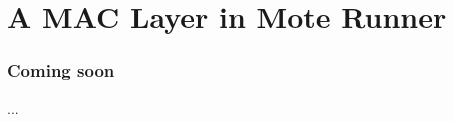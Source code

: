 \section{A MAC Layer in Mote Runner}
\begin{frame}[fragile]
  \frametitle{Coming soon}
  ...
\end{frame}